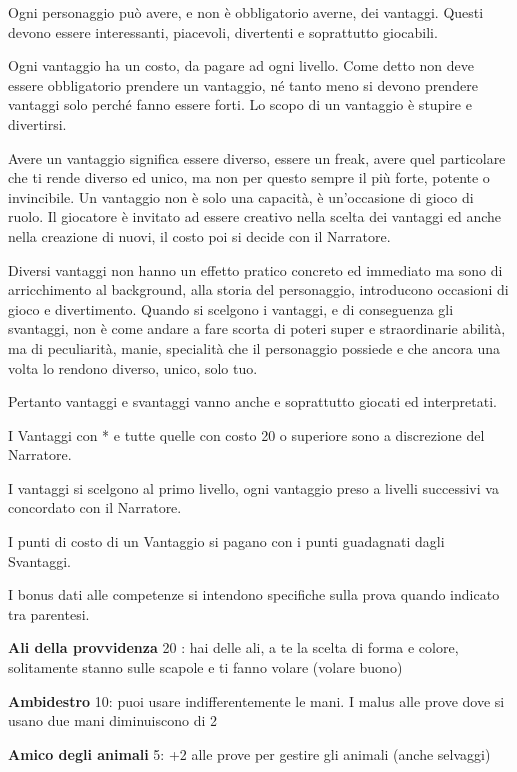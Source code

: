 \documentclass[a4paper,11pt,twoside,openany]{book}
\begin{document}
\bigskip

Ogni personaggio può avere, e non è obbligatorio averne, dei vantaggi. Questi devono essere interessanti, piacevoli, divertenti e soprattutto giocabili.

Ogni vantaggio ha un costo, da pagare ad ogni livello. Come detto non deve essere obbligatorio prendere un vantaggio, né tanto meno si devono prendere vantaggi solo perché fanno essere forti. Lo scopo di un vantaggio è stupire e divertirsi.

Avere un vantaggio significa essere diverso, essere un freak, avere quel particolare che ti rende diverso ed unico, ma non per questo sempre il più forte, potente o invincibile. Un vantaggio non è solo una capacità, è un'occasione di gioco di ruolo. Il giocatore è invitato ad essere creativo nella scelta dei vantaggi ed anche nella creazione di nuovi, il costo poi si decide con il Narratore.

Diversi vantaggi non hanno un effetto pratico concreto ed immediato ma sono di arricchimento al background, alla storia del personaggio, introducono occasioni di gioco e divertimento. Quando si scelgono i vantaggi, e di conseguenza gli svantaggi, non è come andare a fare scorta di poteri super e straordinarie abilità, ma di peculiarità, manie, specialità che il personaggio possiede e che ancora una volta lo rendono diverso, unico, solo tuo.

Pertanto vantaggi e svantaggi vanno anche e soprattutto giocati ed interpretati.

I Vantaggi con {*} e tutte quelle con costo 20 o superiore sono a discrezione del Narratore.

I vantaggi si scelgono al primo livello, ogni vantaggio preso a livelli successivi va concordato con il Narratore.

I punti di costo di un Vantaggio si pagano con i punti guadagnati dagli Svantaggi.

I bonus dati alle competenze si intendono specifiche sulla prova quando indicato tra parentesi.

\bigskip

\textbf{Ali della provvidenza} 20 : hai delle ali, a te la scelta di forma e colore, solitamente stanno sulle scapole e ti fanno volare (volare buono)

\textbf{Ambidestro}\label{Ambidestro} 10: puoi usare indifferentemente le mani. I malus alle prove dove si usano due mani diminuiscono di 2

\textbf{Amico degli animali} 5: +2 alle prove per gestire gli animali (anche selvaggi)
\end{document}
